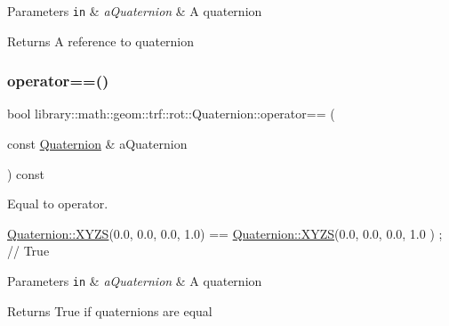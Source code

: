 \begin{DoxyParams}[1]{Parameters}
\mbox{\tt in}  & {\em a\+Quaternion} & A quaternion \\
\hline
\end{DoxyParams}
\begin{DoxyReturn}{Returns}
A reference to quaternion 
\end{DoxyReturn}
\mbox{\label{classlibrary_1_1math_1_1geom_1_1trf_1_1rot_1_1_quaternion_aa3ab0b3893007c45e5cc8ed5e1d16ef0}} 
\subsubsection{\texorpdfstring{operator==()}{operator==()}}
{\footnotesize\ttfamily bool library\+::math\+::geom\+::trf\+::rot\+::\+Quaternion\+::operator== (\begin{DoxyParamCaption}\item[{const \hyperlink{classlibrary_1_1math_1_1geom_1_1trf_1_1rot_1_1_quaternion}{Quaternion} \&}]{a\+Quaternion }\end{DoxyParamCaption}) const}



Equal to operator. 


\begin{DoxyCode}
\hyperlink{classlibrary_1_1math_1_1geom_1_1trf_1_1rot_1_1_quaternion_ad6426210c54c79fc5296b5375380a7ca}{Quaternion::XYZS}(0.0, 0.0, 0.0, 1.0) == \hyperlink{classlibrary_1_1math_1_1geom_1_1trf_1_1rot_1_1_quaternion_ad6426210c54c79fc5296b5375380a7ca}{Quaternion::XYZS}(0.0, 0.0, 0.0, 1.0
      ) ; \textcolor{comment}{// True}
\end{DoxyCode}



\begin{DoxyParams}[1]{Parameters}
\mbox{\tt in}  & {\em a\+Quaternion} & A quaternion \\
\hline
\end{DoxyParams}
\begin{DoxyReturn}{Returns}
True if quaternions are equal 
\end{DoxyReturn}
\mbox{\label{classlibrary_1_1math_1_1geom_1_1trf_1_1rot_1_1_quaternion_a3b08cf0966831af6795cf5db94464891}} 
